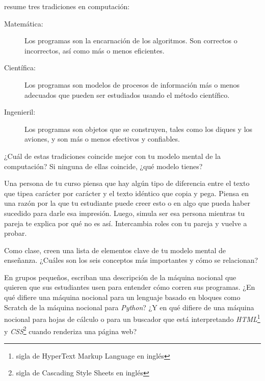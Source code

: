 
\cite{Tedr2008} resume tres tradiciones en computación:

\begin{description}

\item[Matemática:]
  Los programas son la encarnación de los algoritmos. 
Son correctos o incorrectos, así como más o menos eficientes. 

\item[Científica:]
Los programas son modelos de procesos de información más o menos adecuados
que pueden ser estudiados usando el método científico.

\item[Ingenieril:]
Los programas son objetos que se construyen, tales como los diques y los aviones,
y son más o menos efectivos y confiables.

\end{description}
¿Cuál de estas tradiciones coincide mejor con tu modelo mental de la computación?
Si ninguna de ellas coincide, ¿qué modelo tienes?

Una persona de tu curso piensa que hay algún tipo de diferencia entre el texto
que tipea carácter por carácter y el texto idéntico que copia y pega.
Piensa en una razón por la que tu estudiante puede creer esto
o en algo que pueda haber sucedido para darle esa impresión.
Luego, simula ser esa persona mientras tu pareja te explica por qué no es así.
Intercambia roles con tu pareja y vuelve a probar.


Como clase,
creen una lista de elementos clave de tu modelo mental de enseñanza.
¿Cuáles son los seis conceptos más importantes y cómo se relacionan?


En grupos pequeños,
escriban una descripción de la máquina nocional que quieren que sus estudiantes usen para entender cómo corren sus programas.
¿En qué difiere una máquina nocional para un lenguaje basado en bloques como Scratch de la máquina nocional para \emph{Python}?
¿Y en qué difiere de una máquina nocional para hojas de cálculo o para un buscador que está interpretando \emph{HTML}\footnote{sigla de HyperText Markup Language en inglés} y \emph{CSS}\footnote{sigla de Cascading Style Sheets en inglés} cuando renderiza una página web?

